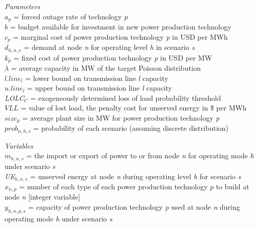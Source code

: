 \documentclass[10pt]{amsart}
\begin{document}
\begin{flushleft}
\textit{Parameters} \\
$a_{p}$ = forced outage rate of technology \textit{p} \\
$b$ = budget available for investment in new power production technology \\
$c_{p}$ = marginal cost of power production technology \textit{p} in USD per MWh \\
$d_{h,n,s}$ = demand at node \textit{n} for operating level \textit{h} in scenario \textit{s} \\
$k_{p}$ = fixed cost of power production technology \textit{p} in USD per MW \\
$\lambda$ = average capacity in MW of the target Poisson distribution \\ 
$l.line_{l}$ = lower bound on transmission line  \textit{l} capacity \\
$u.line_{l}$ = upper bound on transmission line \textit{l} capacity \\
\textit{LOLC}$_{C}$ = exogeneously determined loss of load probability threshold \\
$VLL$ = value of lost load, the penalty cost for unserved energy in \$ per MWh \\
$size_{p}$ = average plant size in MW for power production technology \textit{p} \\
$prob_{n,h,s}$ = probability of each scenario (assuming discrete distribution) \\
\end{flushleft}

\begin{flushleft}
\textit{Variables} \\
$m_{h,n,s}$ = the import or export of power to or from node \textit{n} for operating mode \textit{h} under scenario \textit{s} \\
\textit{UE}$_{h,n,s}$ = unserved energy at node \textit{n} during operating level \textit{h} for scenario \textit{s} \\
$x_{n,p}$ = number of each type of each power production technology $\textit{p}$ to build at node \textit{n} [integer variable] \\
$y_{h,n,p,s}$ = capacity of power production technology \textit{p} used at node \textit{n} during operating mode \textit{h} under scenario \textit{s} \\
\end{flushleft}
\end{document}
